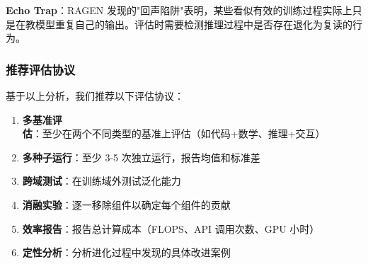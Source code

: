 \textbf{Echo Trap}：RAGEN 发现的"回声陷阱"表明，某些看似有效的训练过程实际上只是在教模型重复自己的输出。评估时需要检测推理过程中是否存在退化为复读的行为。

\subsubsection{推荐评估协议}

基于以上分析，我们推荐以下评估协议：

\begin{enumerate}
\item \textbf{多基准评估}：至少在两个不同类型的基准上评估（如代码+数学、推理+交互）
\item \textbf{多种子运行}：至少 3-5 次独立运行，报告均值和标准差
\item \textbf{跨域测试}：在训练域外测试泛化能力
\item \textbf{消融实验}：逐一移除组件以确定每个组件的贡献
\item \textbf{效率报告}：报告总计算成本（FLOPS、API 调用次数、GPU 小时）
\item \textbf{定性分析}：分析进化过程中发现的具体改进案例
\end{enumerate}
